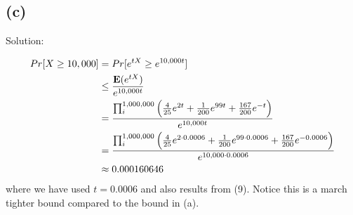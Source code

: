 \documentclass[11pt]{537homework}
\begin{document}

\subsection*{(c)} 

Solution: 

\begin{align}
  Pr[X \geq 10,000]   & = Pr[e^{tX} \geq e^{10,000t}]  \\
                      & \leq {\mathbf{E}(e^{tX}) \over e^{10,000t}} \\
                      & = {\prod_{i}^{1,000,000}\Big( {4 \over 25}e^{2t} + {1 \over 200}e^{99t} + {167 \over 200}e^{-t}\Big) \over e^{10,000t}} \\
                      & = {\prod_{i}^{1,000,000}\Big( {4 \over 25}e^{2\cdot0.0006} + {1 \over 200}e^{99\cdot 0.0006} + {167 \over 200}e^{-0.0006}\Big) \over e^{10,000\cdot 0.0006}} \\
                      & \approx 0.000160646
\end{align}
where we have used $t=0.0006$ and also results from (9). Notice this is a march tighter bound compared to the bound in (a). 
\end{document}
